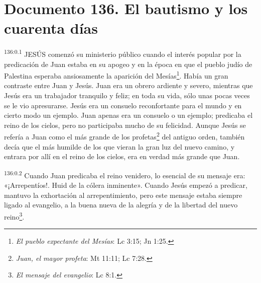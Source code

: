 \chapter{Documento 136. El bautismo y los cuarenta días}
\par 
\textsuperscript{136:0.1} JESÚS comenzó su ministerio público cuando el interés popular por la predicación de Juan estaba en su apogeo y en la época en que el pueblo judío de Palestina esperaba ansiosamente la aparición del Mesías\footnote{\textit{El pueblo expectante del Mesías}: Lc 3:15; Jn 1:25.}. Había un gran contraste entre Juan y Jesús. Juan era un obrero ardiente y severo, mientras que Jesús era un trabajador tranquilo y feliz; en toda su vida, sólo unas pocas veces se le vio apresurarse. Jesús era un consuelo reconfortante para el mundo y en cierto modo un ejemplo. Juan apenas era un consuelo o un ejemplo; predicaba el reino de los cielos, pero no participaba mucho de su felicidad. Aunque Jesús se refería a Juan como el más grande de los profetas\footnote{\textit{Juan, el mayor profeta}: Mt 11:11; Lc 7:28.} del antiguo orden, también decía que el más humilde de los que vieran la gran luz del nuevo camino, y entrara por allí en el reino de los cielos, era en verdad más grande que Juan.

\par 
\textsuperscript{136:0.2} Cuando Juan predicaba el reino venidero, lo esencial de su mensaje era: «¡Arrepentíos!. Huid de la cólera inminente». Cuando Jesús empezó a predicar, mantuvo la exhortación al arrepentimiento, pero este mensaje estaba siempre ligado al evangelio, a la buena nueva de la alegría y de la libertad del nuevo reino\footnote{\textit{El mensaje del evangelio}: Lc 8:1.}.

